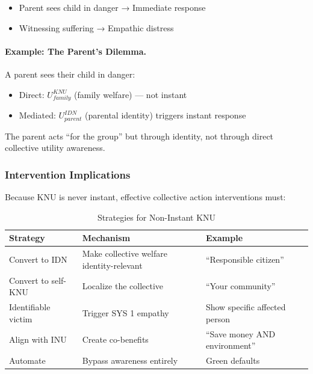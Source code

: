 \begin{itemize}
\item Parent sees child in danger → Immediate response
\item Witnessing suffering → Empathic distress
\end{itemize}

\paragraph{Example: The Parent's Dilemma.}
A parent sees their child in danger:
\begin{itemize}
\item Direct: $U^{KNU}_{family}$ (family welfare) --- not instant
\item Mediated: $U^{IDN}_{parent}$ (parental identity) triggers instant response
\end{itemize}

The parent acts ``for the group'' but through identity, not through direct
collective utility awareness.

\subsubsection{Intervention Implications}

Because KNU is never instant, effective collective action interventions must:

\begin{table}[htbp]
\centering
\caption{Strategies for Non-Instant KNU}
\label{tab:knu-strategies}
\renewcommand{\arraystretch}{1.3}
\begin{tabular}{@{}lll@{}}
\toprule
\textbf{Strategy} & \textbf{Mechanism} & \textbf{Example} \\
\midrule
Convert to IDN & Make collective welfare identity-relevant & ``Responsible citizen'' \\
Convert to self-KNU & Localize the collective & ``Your community'' \\
Identifiable victim & Trigger SYS 1 empathy & Show specific affected person \\
Align with INU & Create co-benefits & ``Save money AND environment'' \\
Automate & Bypass awareness entirely & Green defaults \\
\bottomrule
\end{tabular}
\end{table}

